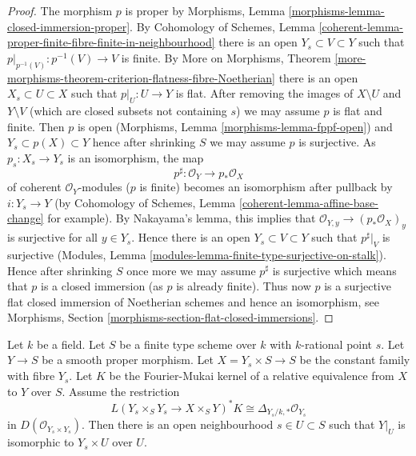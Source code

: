 \begin{proof}
The morphism $p$ is proper by Morphisms, Lemma
\ref{morphisms-lemma-closed-immersion-proper}.
By Cohomology of Schemes, Lemma
\ref{coherent-lemma-proper-finite-fibre-finite-in-neighbourhood}
there is an open $Y_s \subset V \subset Y$ such that
$p|_{p^{-1}(V)} : p^{-1}(V) \to V$ is finite.
By More on Morphisms, Theorem
\ref{more-morphisms-theorem-criterion-flatness-fibre-Noetherian}
there is an open $X_s \subset U \subset X$ such that
$p|_U : U \to Y$ is flat. After removing the images of
$X \setminus U$ and $Y \setminus V$ (which are closed subsets
not containing $s$) we may assume $p$ is flat and finite.
Then $p$ is open (Morphisms, Lemma \ref{morphisms-lemma-fppf-open})
and $Y_s \subset p(X) \subset Y$ hence after shrinking $S$
we may assume $p$ is surjective.
As $p_s : X_s \to Y_s$ is an isomorphism, the map
$$
p^\sharp : \mathcal{O}_Y \longrightarrow p_*\mathcal{O}_X
$$
of coherent $\mathcal{O}_Y$-modules ($p$ is finite)
becomes an isomorphism after pullback by $i : Y_s \to Y$
(by Cohomology of Schemes, Lemma
\ref{coherent-lemma-affine-base-change} for example).
By Nakayama's lemma, this implies that
$\mathcal{O}_{Y, y} \to (p_*\mathcal{O}_X)_y$ is surjective
for all $y \in Y_s$. Hence there is an open $Y_s \subset V \subset Y$
such that $p^\sharp|_V$ is surjective
(Modules, Lemma \ref{modules-lemma-finite-type-surjective-on-stalk}).
Hence after shrinking $S$ once more we may assume
$p^\sharp$ is surjective which means that $p$ is a closed
immersion (as $p$ is already finite).
Thus now $p$ is a surjective flat closed immersion
of Noetherian schemes and hence an isomorphism, see
Morphisms, Section \ref{morphisms-section-flat-closed-immersions}.
\end{proof}

\begin{lemma}
\label{lemma-no-deformations}
Let $k$ be a field. Let $S$ be a finite type scheme over $k$
with $k$-rational point $s$. Let $Y \to S$ be a smooth proper morphism.
Let $X = Y_s \times S \to S$ be the constant family with fibre
$Y_s$. Let $K$ be the Fourier-Mukai kernel of a relative equivalence
from $X$ to $Y$ over $S$. Assume the restriction
$$
L(Y_s \times_S Y_s \to X \times_S Y)^*K \cong 
\Delta_{Y_s/k, *} \mathcal{O}_{Y_s}
$$
in $D(\mathcal{O}_{Y_s \times Y_s})$. Then there is an open neighbourhood
$s \in U \subset S$ such that $Y|_U$ is isomorphic to $Y_s \times U$ over $U$.
\end{lemma}

